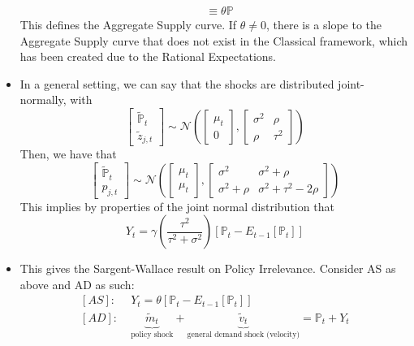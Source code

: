 \documentclass[12pt]{article}
\begin{document}
\begin{itemize}
\begin{equation}
\begin{split}
            &\equiv \theta \mathbb{P}
        \end{split}
    \end{equation}
    This defines the Aggregate Supply curve. If $\theta \neq 0$, there is a slope to the Aggregate Supply curve that does not exist in the Classical framework, which has been created due to the Rational Expectations.
    \item In a general setting, we can say that the shocks are distributed joint-normally, with
    \[\begin{bmatrix}
    \widetilde{\mathbb{P}}_t \\
    \widetilde{z}_{j,t}
    \end{bmatrix} \sim \mathcal{N}\left(\begin{bmatrix}
    \mu_t \\
    0
    \end{bmatrix}, \begin{bmatrix}
    \sigma^2 & \rho \\
    \rho & \tau^2
    \end{bmatrix}\right)\]
    Then, we have that
    \[\begin{bmatrix}
    \widetilde{\mathbb{P}}_t \\
    p_{j,t}
    \end{bmatrix} \sim \mathcal{N}\left(\begin{bmatrix}
    \mu_t \\
    \mu_t
    \end{bmatrix}, \begin{bmatrix}
    \sigma^2 & \sigma^2 + \rho \\
    \sigma^2 + \rho & \sigma^2 + \tau^2 - 2\rho
    \end{bmatrix}\right)\]
    This implies by properties of the joint normal distribution that
    \begin{equation}\label{Lucas AS General}
        Y_t = \gamma \left(\frac{\tau^2}{\tau^2 + \sigma^2}\right)\left[\mathbb{P}_t - E_{t-1}[\mathbb{P}_t]\right]
    \end{equation}
    \item This gives the Sargent-Wallace result on Policy Irrelevance. Consider AS as above and AD as such:
    \[\begin{split}
        [AS]:&\; Y_t = \theta\left[\mathbb{P}_t - E_{t-1}[\mathbb{P}_t]\right] \\
        [AD]:&\; \underbrace{\widetilde{m}_t}_{\text{policy shock}} + \underbrace{\widetilde{v}_t}_{\text{general demand shock (velocity)}} = \mathbb{P}_t + Y_t \\

\end{split}\]
\end{itemize}
\end{document}
